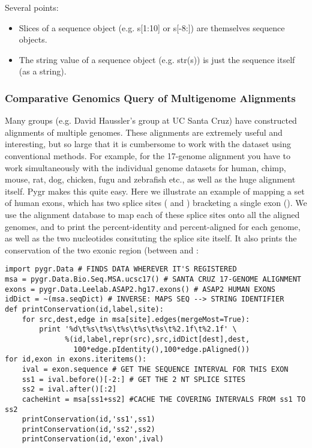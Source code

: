 \documentclass{howto}
\begin{document}
Several points:
\begin{itemize}

\item
   Slices of a sequence object (e.g. s[1:10] or s[-8:]) are themselves sequence objects.

\item    
The string value of a sequence object (e.g. str(s)) is just the sequence itself (as a string).

\end{itemize}

\subsubsection{Comparative Genomics Query of Multigenome Alignments}

Many groups (e.g. David Haussler's group at UC Santa Cruz) have constructed alignments of multiple genomes.  These alignments are extremely useful and interesting, but so large that it is cumbersome to work with the dataset using conventional methods.  For example, for the 17-genome alignment you have to work simultaneously with the individual genome datasets for human, chimp, mouse, rat, dog, chicken, fugu and zebrafish etc., as well as the huge alignment itself.  Pygr makes this quite easy.  Here we illustrate an example of mapping a set of human exons, which has two splice sites
( and ) bracketing a single exon ().
We use the alignment database to map each of these splice sites onto all the aligned
genomes, and to print the percent-identity and percent-aligned for each genome,
as well as the two nucleotides consituting the splice site itself.
It also prints the conservation of the two exonic region (between 
and : 

\begin{verbatim}
import pygr.Data # FINDS DATA WHEREVER IT'S REGISTERED
msa = pygr.Data.Bio.Seq.MSA.ucsc17() # SANTA CRUZ 17-GENOME ALIGNMENT
exons = pygr.Data.Leelab.ASAP2.hg17.exons() # ASAP2 HUMAN EXONS
idDict = ~(msa.seqDict) # INVERSE: MAPS SEQ --> STRING IDENTIFIER
def printConservation(id,label,site):
    for src,dest,edge in msa[site].edges(mergeMost=True):
        print '%d\t%s\t%s\t%s\t%s\t%s\t%2.1f\t%2.1f' \
              %(id,label,repr(src),src,idDict[dest],dest,
                100*edge.pIdentity(),100*edge.pAligned())
for id,exon in exons.iteritems():
    ival = exon.sequence # GET THE SEQUENCE INTERVAL FOR THIS EXON
    ss1 = ival.before()[-2:] # GET THE 2 NT SPLICE SITES
    ss2 = ival.after()[:2]
    cacheHint = msa[ss1+ss2] #CACHE THE COVERING INTERVALS FROM ss1 TO ss2
    printConservation(id,'ss1',ss1)
    printConservation(id,'ss2',ss2)
    printConservation(id,'exon',ival)
\end{verbatim}
\end{document}
